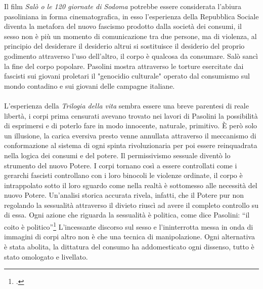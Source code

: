 Il film \textit{Salò o le 120 giornate di Sodoma} potrebbe essere considerata l'abiura pasoliniana in forma cinematografica, in esso l'esperienza della Repubblica Sociale diventa la metafora del nuovo fascismo prodotto dalla società dei consumi, il sesso non è più un momento di comunicazione tra due persone, ma di violenza, al principio del desiderare il desiderio altrui si sostituisce il desiderio del proprio godimento attraverso l'uso dell'altro, il corpo è qualcosa da consumare.
Salò sancì la fine del corpo popolare.
Pasolini mostra attraverso le torture esercitate dai fascisti sui giovani proletari il "genocidio culturale" operato dal consumismo sul mondo contadino e sui giovani delle campagne italiane.

\paragraph{}L'esperienza della \textit{Trilogia della vita} sembra essere una breve parentesi di reale libertà, i corpi prima censurati avevano trovato nei lavori di Pasolini la possibilità di esprimersi e di poterlo fare in modo innocente, naturale, primitivo.
È però solo un illusione, la carica eversiva presto venne annullata attraverso il meccanismo di conformazione al sistema di ogni spinta rivoluzionaria per poi essere reinquadrata nella logica dei consumi e del potere.
Il permissivismo sessuale diventò lo strumento del nuovo Potere. 
I corpi tornano così a essere controllati come i gerarchi fascisti controllano con i loro binocoli le violenze ordinate, il corpo è intrappolato sotto il loro sguardo come nella realtà è sottomesso alle necessità del nuovo Potere.
Un'analisi storica accurata rivela, infatti, che il Potere pur non regolando la sessualità attraverso il divieto riuscì ad avere il completo controllo su di essa.
Ogni azione che riguarda la sessualità è politica, come dice Pasolini: \enquote{il coito è politico}\footcite{Scritti8}
L'incessante discorso sul sesso e l'ininterrotta messa in onda di immagini di corpi altro non è che una tecnica di manipolazione.
Ogni alternativa è stata abolita, la dittatura del consumo ha addomesticato ogni dissenso, tutto è stato omologato e livellato.





